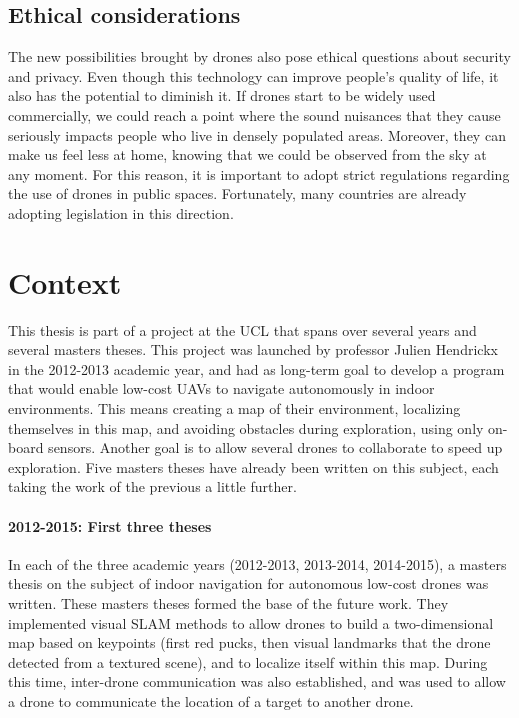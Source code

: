 \subsection{Ethical considerations}
The new possibilities brought by drones also pose ethical questions about security and privacy. Even though this technology can improve people's quality of life, it also has the potential to diminish it. If drones start to be widely used commercially, we could reach a point where the sound nuisances that they cause seriously impacts people who live in densely populated areas. Moreover, they can make us feel less at home, knowing that we could be observed from the sky at any moment. For this reason, it is important to adopt strict regulations regarding the use of drones in public spaces. Fortunately, many countries are already adopting legislation in this direction.


\section{Context}
This thesis is part of a project at the UCL that spans over several years and several masters theses. This project was launched by professor Julien Hendrickx in the 2012-2013 academic year, and had as long-term goal to develop a program that would enable low-cost UAVs to navigate autonomously in indoor environments. This means creating a map of their environment, localizing themselves in this map, and avoiding obstacles during exploration, using only on-board sensors. Another goal is to allow several drones to collaborate to speed up exploration. Five masters theses have already been written on this subject, each taking the work of the previous a little further.
\paragraph{2012-2015: First three theses}
In each of the three academic years (2012-2013, 2013-2014, 2014-2015), a masters thesis on the subject of indoor navigation for autonomous low-cost drones was written. These masters theses formed the base of the future work. They implemented visual SLAM methods to allow drones to build a two-dimensional map based on keypoints (first red pucks, then visual landmarks that the drone detected from a textured scene), and to localize itself within this map. During this time, inter-drone communication was also established, and was used to allow a drone to communicate the location of a target to another drone.

